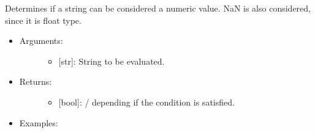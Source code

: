 \documentclass[letterpaper,10pt,english]{sphinxmanual}
\begin{document}
\begin{fulllineitems}
\label{\detokenize{strings:data_tools.strings.is_numeric}}
Determines if a string can be considered a numeric value. NaN is
also considered, since it is float type.
\begin{itemize}
\item {} \begin{description}
\item[{Arguments:}] \leavevmode\begin{itemize}
\item {} 
 {[}str{]}: String to be evaluated.

\end{itemize}

\end{description}

\item {} \begin{description}
\item[{Returns:}] \leavevmode\begin{itemize}
\item {} 
{[}bool{]}: / depending if the condition is
satisfied.

\end{itemize}

\end{description}

\item {} \begin{description}
\item[{Examples:}] \leavevmode
\begin{sphinxVerbatim}[commandchars=\\\{\}]
\end{sphinxVerbatim}

\end{description}

\end{itemize}

\end{fulllineitems}
\end{document}

